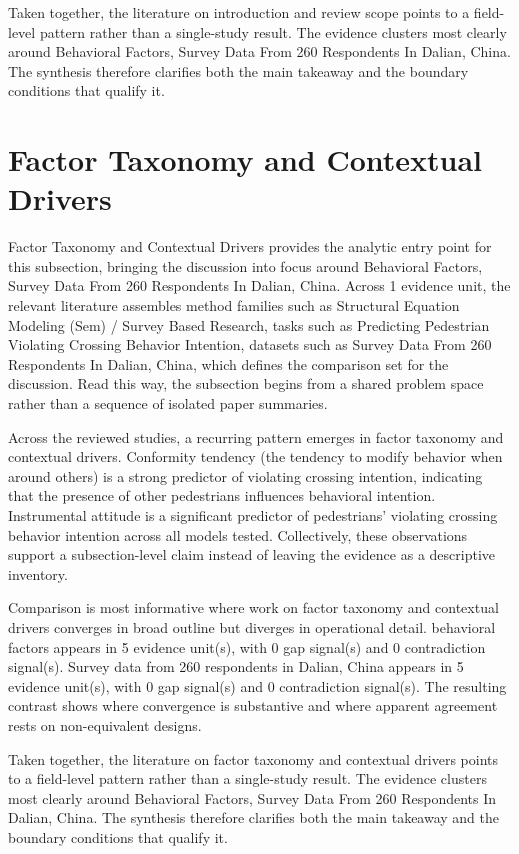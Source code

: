 \documentclass{article}
\begin{document}
Taken together, the literature on introduction and review scope points to a field-level pattern rather than a single-study result. The evidence clusters most clearly around Behavioral Factors, Survey Data From 260 Respondents In Dalian, China. The synthesis therefore clarifies both the main takeaway and the boundary conditions that qualify it. \cite{08_2016_zhou_aap}

\section{Factor Taxonomy and Contextual Drivers}
Factor Taxonomy and Contextual Drivers provides the analytic entry point for this subsection, bringing the discussion into focus around Behavioral Factors, Survey Data From 260 Respondents In Dalian, China. Across 1 evidence unit, the relevant literature assembles method families such as Structural Equation Modeling (Sem) / Survey Based Research, tasks such as Predicting Pedestrian Violating Crossing Behavior Intention, datasets such as Survey Data From 260 Respondents In Dalian, China, which defines the comparison set for the discussion. Read this way, the subsection begins from a shared problem space rather than a sequence of isolated paper summaries. \cite{08_2016_zhou_aap}

Across the reviewed studies, a recurring pattern emerges in factor taxonomy and contextual drivers. Conformity tendency (the tendency to modify behavior when around others) is a strong predictor of violating crossing intention, indicating that the presence of other pedestrians influences behavioral intention. Instrumental attitude is a significant predictor of pedestrians' violating crossing behavior intention across all models tested. Collectively, these observations support a subsection-level claim instead of leaving the evidence as a descriptive inventory. \cite{08_2016_zhou_aap}

Comparison is most informative where work on factor taxonomy and contextual drivers converges in broad outline but diverges in operational detail. behavioral factors appears in 5 evidence unit(s), with 0 gap signal(s) and 0 contradiction signal(s). Survey data from 260 respondents in Dalian, China appears in 5 evidence unit(s), with 0 gap signal(s) and 0 contradiction signal(s). The resulting contrast shows where convergence is substantive and where apparent agreement rests on non-equivalent designs. \cite{08_2016_zhou_aap}

Taken together, the literature on factor taxonomy and contextual drivers points to a field-level pattern rather than a single-study result. The evidence clusters most clearly around Behavioral Factors, Survey Data From 260 Respondents In Dalian, China. The synthesis therefore clarifies both the main takeaway and the boundary conditions that qualify it. \cite{08_2016_zhou_aap}
\end{document}
